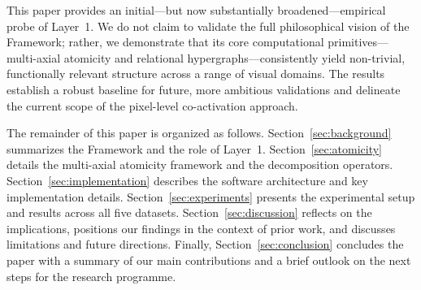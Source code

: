 This paper provides an initial---but now substantially broadened---empirical probe of Layer~1. We do not claim to validate the full philosophical vision of the \Apeiron{} Framework; rather, we demonstrate that its core computational primitives---multi-axial atomicity and relational hypergraphs---consistently yield non-trivial, functionally relevant structure across a range of visual domains. The results establish a robust baseline for future, more ambitious validations and delineate the current scope of the pixel-level co-activation approach.

The remainder of this paper is organized as follows. Section~\ref{sec:background} summarizes the \Apeiron{} Framework and the role of Layer~1. Section~\ref{sec:atomicity} details the multi-axial atomicity framework and the decomposition operators. Section~\ref{sec:implementation} describes the software architecture and key implementation details. Section~\ref{sec:experiments} presents the experimental setup and results across all five datasets. Section~\ref{sec:discussion} reflects on the implications, positions our findings in the context of prior work, and discusses limitations and future directions. Finally, Section~\ref{sec:conclusion} concludes the paper with a summary of our main contributions and a brief outlook on the next steps for the \Apeiron{} research programme.